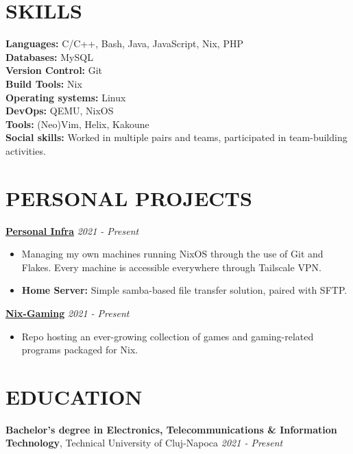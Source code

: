\documentclass[margin]{res}
\begin{document}
\begin{resume}
  \section{SKILLS}
  {\bf Languages:} C/C++, Bash, Java, JavaScript, Nix, PHP\\
  {\bf Databases:} MySQL\\
  {\bf Version Control:} Git\\
  {\bf Build Tools:} Nix\\
  {\bf Operating systems:} Linux\\
  {\bf DevOps:} QEMU, NixOS\\
  {\bf Tools:} (Neo)Vim, Helix, Kakoune\\

  \vspace{-6mm}
  {\bf Social skills:} Worked in multiple pairs and teams, participated in team-building activities.

  \section{PERSONAL PROJECTS}
  {\bf \href{https://github.com/fufexan/dotfiles}{Personal Infra}} \hfill \textit{2021 - Present}\\
  \vspace{-4mm}
  \begin{itemize} %
    \item Managing my own machines running NixOS through the use of Git and Flakes. Every machine is accessible everywhere through Tailscale VPN.
    \item \textbf{Home Server:} Simple samba-based file transfer solution, paired with SFTP.
  \end{itemize}
  \vspace{-3mm}
  {\bf \href{https://github.com/fufexan/nix-gaming}{Nix-Gaming}} \hfill \textit{2021 - Present}\\
  \vspace{-3mm}
  \begin{itemize} %
    \item Repo hosting an ever-growing collection of games and gaming-related programs packaged for Nix.
  \end{itemize}

  \pagebreak

  \section{EDUCATION}
  {\bf Bachelor's degree in Electronics, Telecommunications \& Information Technology}, Technical University of Cluj-Napoca \hfill \textit{2021 - Present}\\
  

\end{resume}
\end{document}
